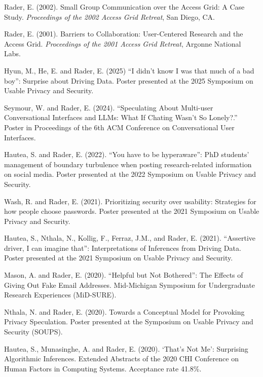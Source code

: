 \documentclass[9pt]{extarticle}
\makeatletter
\renewcommand{\section}{%
  \@startsection{section}{1}{0em}{\baselineskip}{3pt}{\large\bfseries\textsc}}
\makeatother
\begin{document}
Rader, E. (2002). Small Group Communication over the Access Grid: A Case Study. \emph{Proceedings of the 2002 Access Grid Retreat}, San Diego, CA.

Rader, E. (2001). Barriers to Collaboration: User-Centered Research and the Access Grid. \emph{Proceedings of the 2001 Access Grid Retreat}, Argonne National Labs.



\section{Extended Abstracts and Posters}

Hyun, M., He, E. and Rader, E. (2025) ``I didn't know I was that much of a bad boy'': Surprise about Driving Data. Poster presented at the 2025 Symposium on Usable Privacy and Security.

Seymour, W. and Rader, E. (2024). ``Speculating About Multi-user Conversational Interfaces and LLMs: What If Chating Wasn't So Lonely?.'' Poster in Proceedings of the 6th ACM Conference on Conversational User Interfaces. 

Hautea, S. and Rader, E. (2022). ``You have to be hyperaware'': PhD students' management of boundary turbulence when posting research-related information on social media. Poster presented at the 2022 Symposium on Usable Privacy and Security.

Wash, R. and Rader, E. (2021). Prioritizing security over usability: Strategies for how people choose passwords. Poster presented at the 2021 Symposium on Usable Privacy and Security.

Hautea, S., Nthala, N., Kollig, F., Ferraz, J.M., and Rader, E. (2021). ``Assertive driver, I can imagine that'': Interpretations of Inferences from Driving Data. Poster presented at the 2021 Symposium on Usable Privacy and Security.

Mason, A. and Rader, E. (2020). ``Helpful but Not Bothered'': The Effects of Giving Out Fake Email Addresses. Mid-Michigan Symposium for Undergraduate Research Experiences (MiD-SURE).

Nthala, N. and Rader, E. (2020). Towards a Conceptual Model for Provoking Privacy Speculation. Poster presented at the Symposium on Usable Privacy and Security (SOUPS).

Hautea, S., Munasinghe, A. and Rader, E. (2020). `That's Not Me': Surprising Algorithmic Inferences. Extended Abstracts of the 2020 CHI Conference on Human Factors in Computing Systems. Acceptance rate 41.8\%.
\end{document}
